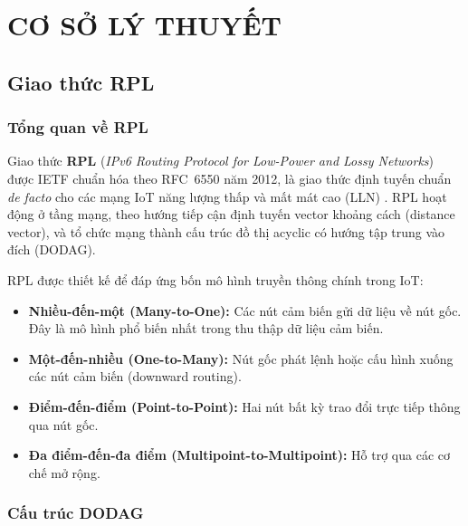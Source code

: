 \section{CƠ SỞ LÝ THUYẾT}
\label{sec:ch2}

\subsection{Giao thức RPL}
\label{subsec:rpl}

\subsubsection{Tổng quan về RPL}

Giao thức \textbf{RPL} (\textit{IPv6 Routing Protocol for Low-Power and
Lossy Networks}) được IETF chuẩn hóa theo RFC~6550 năm 2012, là giao thức
định tuyến chuẩn \textit{de facto} cho các mạng IoT năng lượng thấp và mất
mát cao (LLN) \cite{winter2012rpl}. RPL hoạt động ở tầng mạng, theo hướng
tiếp cận định tuyến vector khoảng cách (distance vector), và tổ chức mạng
thành cấu trúc đồ thị acyclic có hướng tập trung vào đích (DODAG).

RPL được thiết kế để đáp ứng bốn mô hình truyền thông chính trong IoT:

\begin{itemize}
    \item \textbf{Nhiều-đến-một (Many-to-One):} Các nút cảm biến gửi dữ
          liệu về nút gốc. Đây là mô hình phổ biến nhất trong thu thập
          dữ liệu cảm biến.
    \item \textbf{Một-đến-nhiều (One-to-Many):} Nút gốc phát lệnh hoặc
          cấu hình xuống các nút cảm biến (downward routing).
    \item \textbf{Điểm-đến-điểm (Point-to-Point):} Hai nút bất kỳ trao
          đổi trực tiếp thông qua nút gốc.
    \item \textbf{Đa điểm-đến-đa điểm (Multipoint-to-Multipoint):} Hỗ
          trợ qua các cơ chế mở rộng.
\end{itemize}

\subsubsection{Cấu trúc DODAG}

